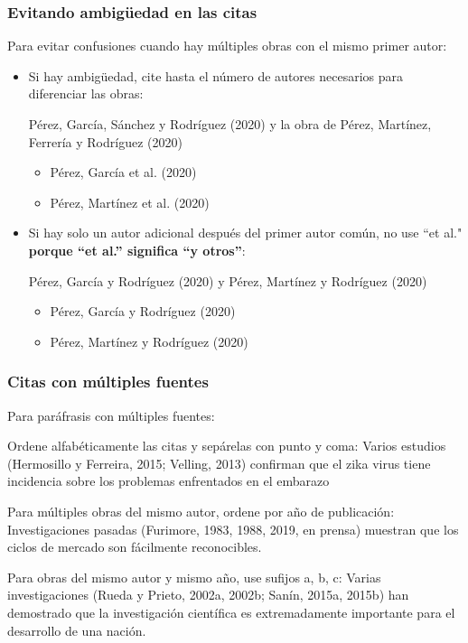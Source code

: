 \documentclass[
11pt, %
]{beamer}
\begin{document}
\begin{frame}
	\frametitle{Evitando ambigüedad en las citas}

	Para evitar confusiones cuando hay múltiples obras con el mismo primer autor:

	\begin{itemize}
		\item Si hay ambigüedad, cite hasta el número de autores necesarios para diferenciar las obras:
		      \begin{exampleblock}{Pérez, García, Sánchez y Rodríguez (2020) y la obra de Pérez, Martínez, Ferrería y Rodríguez (2020)}
			      \begin{itemize}
				      \item Pérez, García et al. (2020)
				      \item Pérez, Martínez et al. (2020)
			      \end{itemize}
		      \end{exampleblock}


		\item Si hay solo un autor adicional después del primer autor común, no use ``et al." \textbf{porque “et al.” significa “y otros”}:
		      \begin{exampleblock}{Pérez, García y Rodríguez (2020) y Pérez, Martínez y Rodríguez (2020)}
			      \begin{itemize}
				      \item Pérez, García y Rodríguez (2020)
				      \item Pérez, Martínez y Rodríguez (2020)
			      \end{itemize}
		      \end{exampleblock}
	\end{itemize}

\end{frame}

\begin{frame}
	\frametitle{Citas con múltiples fuentes}

	Para paráfrasis con múltiples fuentes:

	\begin{exampleblock}{Ordene alfabéticamente las citas y sepárelas con punto y coma:}
		Varios estudios (Hermosillo y Ferreira, 2015; Velling, 2013) confirman que el zika virus tiene incidencia sobre los problemas enfrentados en el embarazo
	\end{exampleblock}

	\begin{exampleblock}{Para múltiples obras del mismo autor, ordene por año de publicación:}
		Investigaciones pasadas (Furimore, 1983, 1988, 2019, en prensa) muestran que los ciclos de mercado son fácilmente reconocibles.
	\end{exampleblock}

	\begin{exampleblock}{Para obras del mismo autor y mismo año, use sufijos a, b, c:}
		Varias investigaciones (Rueda y Prieto, 2002a, 2002b; Sanín, 2015a, 2015b) han demostrado que la investigación científica es extremadamente importante para el desarrollo de una nación.
	\end{exampleblock}

\end{frame}
\end{document}

